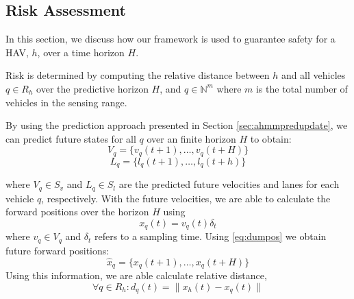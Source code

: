 \documentclass[letterpaper, 10 pt, conference]{ieeeconf}  %
\newcommand\NB[1]{$\spadesuit$\footnote{NB: #1}}
\newcommand\RP[1]{$\clubsuit$\footnote{RP: #1}}
\begin{document}
\subsection{Risk Assessment}

 In this section, we discuss how our framework is used to guarantee safety for a HAV, $h$, over a time horizon $H$.
 
 
 Risk is determined by computing the relative distance between $h$ and all vehicles $q\in R_h$ over the predictive horizon $H$, and $q\in\mathbb{N}^m$ where $m$ is the total number of vehicles in the sensing range.


By using the prediction approach presented in Section \ref{sec:ahmmpredupdate}, we can predict future states for all $q$ over an finite horizon $H$ to obtain:
\begin{equation}
    V_q = \{v_q(t+1),\ldots,v_q(t+H)\}
\end{equation}
\begin{equation}
    L_q = \{l_q(t+1),\ldots,l_q(t+h)\}
\end{equation}


where $V_q\in S_v$ and $L_q\in S_l$ are the predicted future velocities and lanes for each vehicle $q$, respectively.
With the future velocities, we are able to calculate the forward positions over the horizon $H$ using %
\begin{equation} \label{eq:dumpos}
    x_q(t) = v_q(t)\delta_t
\end{equation}
where $v_q\in V_q$ and $\delta_t$ refers to a sampling time. Using \eqref{eq:dumpos} we obtain future forward positions:
\begin{equation}
    \hat{x}_q = \{x_q(t+1),\ldots,x_q(t+H)\}
\end{equation}
Using this information, we are able calculate relative distance,
\begin{equation}
    \forall q \in R_h: d_q(t) = \lVert x_h(t)-x_q(t)\rVert
\end{equation}
\end{document}
